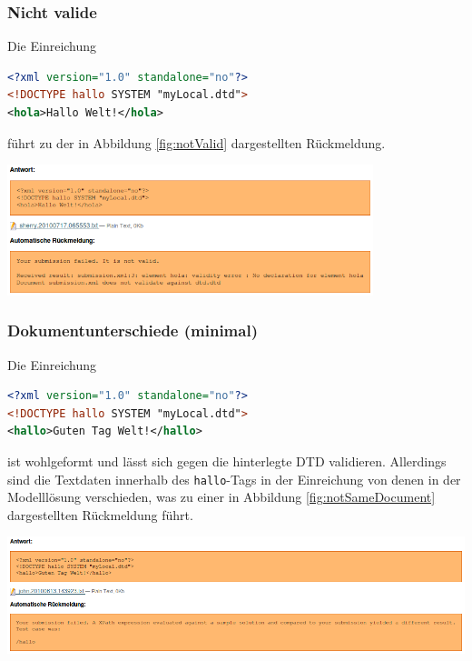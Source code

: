 \documentclass[a4paper]{scrartcl}
\begin{document}
  	  \subsubsection{Nicht valide}
  	  Die Einreichung
  	  \begin{lstlisting}[language=XML, captionpos=b, frame=tlRB, caption={Nicht valide Einreichung.}]
<?xml version="1.0" standalone="no"?>
<!DOCTYPE hallo SYSTEM "myLocal.dtd">
<hola>Hallo Welt!</hola>
\end{lstlisting}
  	  führt zu der in Abbildung \ref{fig:notValid} dargestellten Rückmeldung.
  	  \begin{center}
        \captionsetup{type=figure}
	      \includegraphics[width=0.8\textwidth]{images/notValid.png}
	      \label{fig:notValid}
      \end{center}
      
      \subsubsection{Dokumentunterschiede (minimal)}
      Die Einreichung
  	  \begin{lstlisting}[language=XML, captionpos=b, frame=tlRB, caption={Beispiel für eine semantisch falsche XML-Datei.}]
<?xml version="1.0" standalone="no"?>
<!DOCTYPE hallo SYSTEM "myLocal.dtd">
<hallo>Guten Tag Welt!</hallo>
\end{lstlisting}
      ist wohlgeformt und lässt sich gegen die hinterlegte DTD validieren. Allerdings sind die Textdaten innerhalb des \texttt{hallo}-Tags in der Einreichung von denen in der Modelllösung verschieden, was zu einer in Abbildung \ref{fig:notSameDocument} dargestellten Rückmeldung führt.
  	  \begin{center}
        \captionsetup{type=figure}
	      \includegraphics[width=1\textwidth]{images/notSameDocument.png}
	      \label{fig:notSameDocument}
      \end{center}
      
\end{document}
